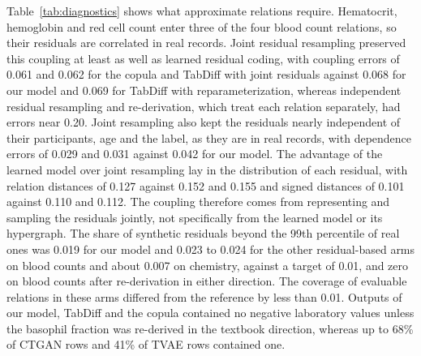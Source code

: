 \documentclass[conference]{IEEEtran}
\begin{document}
Table~\ref{tab:diagnostics} shows what approximate relations require. Hematocrit, hemoglobin and red cell count enter three of the four blood count relations, so their residuals are correlated in real records. Joint residual resampling preserved this coupling at least as well as learned residual coding, with coupling errors of 0.061 and 0.062 for the copula and TabDiff with joint residuals against 0.068 for our model and 0.069 for TabDiff with reparameterization, whereas independent residual resampling and re-derivation, which treat each relation separately, had errors near 0.20. Joint resampling also kept the residuals nearly independent of their participants, age and the label, as they are in real records, with dependence errors of 0.029 and 0.031 against 0.042 for our model. The advantage of the learned model over joint resampling lay in the distribution of each residual, with relation distances of 0.127 against 0.152 and 0.155 and signed distances of 0.101 against 0.110 and 0.112. The coupling therefore comes from representing and sampling the residuals jointly, not specifically from the learned model or its hypergraph. The share of synthetic residuals beyond the 99th percentile of real ones was 0.019 for our model and 0.023 to 0.024 for the other residual-based arms on blood counts and about 0.007 on chemistry, against a target of 0.01, and zero on blood counts after re-derivation in either direction. The coverage of evaluable relations in these arms differed from the reference by less than 0.01. Outputs of our model, TabDiff and the copula contained no negative laboratory values unless the basophil fraction was re-derived in the textbook direction, whereas up to 68\% of CTGAN rows and 41\% of TVAE rows contained one.
\end{document}
